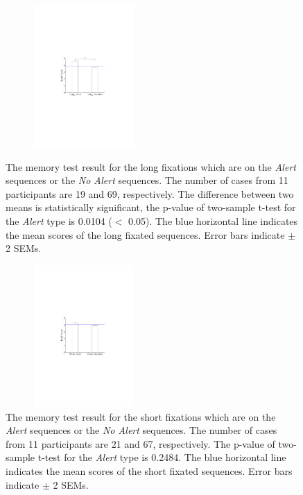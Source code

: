 \documentclass[oneside,master]{snueethesis}
\begin{document}
\begin{figure}
  \begin{minipage}{.5\textwidth}\centerline{\includegraphics[width=60mm,height=54mm,trim=58mm 110mm 62mm 105mm]{./eps/memtest_long.pdf}}
  \caption[The memory test result for the long fixations which are on Alert sequences or No Alert sequences]{The memory test result for the long fixations which are on the \textit{Alert} sequences or the \textit{No Alert} sequences. The number of cases from 11 participants are 19 and 69, respectively. The difference between two means is statistically significant, the p-value of two-sample t-test for the \textit{Alert} type is 0.0104 ($<$ 0.05). The blue horizontal line indicates the mean scores of the long fixated sequences. Error bars indicate $\pm$ 2 SEMs.}
  \label{fig:memtest-long}
  \end{minipage}

  \vskip 0.28in

  \begin{minipage}{.5\textwidth}\centerline{\includegraphics[width=60mm,height=54mm,trim=58mm 110mm 62mm 105mm]{./eps/memtest_short.pdf}}
  \caption[The memory test result for the short fixations which are on the \textit{Alert} sequences or the \textit{No Alert} sequences]{The memory test result for the short fixations which are on the \textit{Alert} sequences or the \textit{No Alert} sequences. The number of cases from 11 participants are 21 and 67, respectively. The p-value of two-sample t-test for the \textit{Alert} type is 0.2484. The blue horizontal line indicates the mean scores of the short fixated sequences. Error bars indicate $\pm$ 2 SEMs.}
  \label{fig:memtest-short}
  \end{minipage}
\end{figure}
\end{document}
